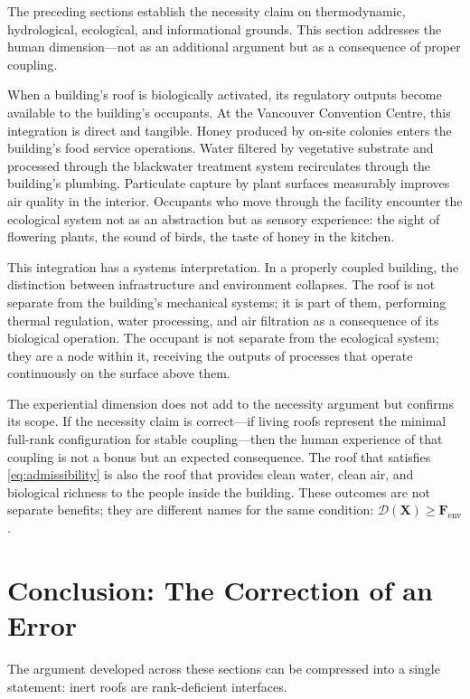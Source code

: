 \documentclass[12pt, a4paper]{article}
\theoremstyle{plain}
\theoremstyle{remark}
\begin{document}
The preceding sections establish the necessity claim on thermodynamic, hydrological, ecological, and informational grounds. This section addresses the human dimension---not as an additional argument but as a consequence of proper coupling.

When a building's roof is biologically activated, its regulatory outputs become available to the building's occupants. At the Vancouver Convention Centre, this integration is direct and tangible. Honey produced by on-site colonies enters the building's food service operations. Water filtered by vegetative substrate and processed through the blackwater treatment system recirculates through the building's plumbing. Particulate capture by plant surfaces measurably improves air quality in the interior. Occupants who move through the facility encounter the ecological system not as an abstraction but as sensory experience: the sight of flowering plants, the sound of birds, the taste of honey in the kitchen.

This integration has a systems interpretation. In a properly coupled building, the distinction between infrastructure and environment collapses. The roof is not separate from the building's mechanical systems; it is part of them, performing thermal regulation, water processing, and air filtration as a consequence of its biological operation. The occupant is not separate from the ecological system; they are a node within it, receiving the outputs of processes that operate continuously on the surface above them.

The experiential dimension does not add to the necessity argument but confirms its scope. If the necessity claim is correct---if living roofs represent the minimal full-rank configuration for stable coupling---then the human experience of that coupling is not a bonus but an expected consequence. The roof that satisfies \eqref{eq:admissibility} is also the roof that provides clean water, clean air, and biological richness to the people inside the building. These outcomes are not separate benefits; they are different names for the same condition: $\mathcal{D}(\mathbf{X}) \geq \mathbf{F}_{\text{env}}$.

\section{Conclusion: The Correction of an Error}

The argument developed across these sections can be compressed into a single statement: inert roofs are rank-deficient interfaces.
\end{document}
